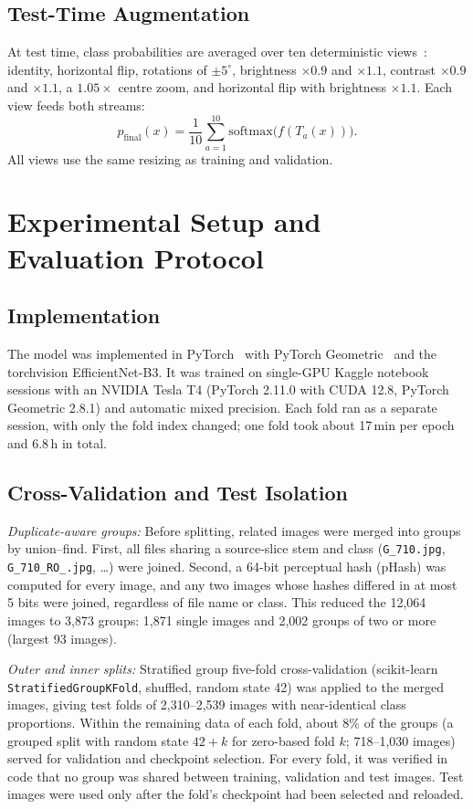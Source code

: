 \documentclass[journal,onecolumn]{IEEEtran}
\newcommand{\fname}[1]{\texttt{#1}}
\begin{document}
\subsection{Test-Time Augmentation}\label{sec:tta}
At test time, class probabilities are averaged over ten deterministic views~\cite{wang2019tta}: identity, horizontal flip, rotations of $\pm 5^\circ$, brightness $\times 0.9$ and $\times 1.1$, contrast $\times 0.9$ and $\times 1.1$, a $1.05\times$ centre zoom, and horizontal flip with brightness $\times 1.1$. Each view feeds both streams:
\begin{equation}
p_{\mathrm{final}}(x) = \frac{1}{10} \sum_{a=1}^{10} \mathrm{softmax}\big(f(T_a(x))\big).
\end{equation}
All views use the same resizing as training and validation.

\section{Experimental Setup and Evaluation Protocol}
\subsection{Implementation}
The model was implemented in PyTorch~\cite{paszke2019pytorch} with PyTorch Geometric~\cite{fey2019pyg} and the torchvision EfficientNet-B3. It was trained on single-GPU Kaggle notebook sessions with an NVIDIA Tesla T4 (PyTorch 2.11.0 with CUDA 12.8, PyTorch Geometric 2.8.1) and automatic mixed precision. Each fold ran as a separate session, with only the fold index changed; one fold took about 17\,min per epoch and 6.8\,h in total.

\subsection{Cross-Validation and Test Isolation}\label{sec:cv}
\textit{Duplicate-aware groups:} Before splitting, related images were merged into groups by union--find. First, all files sharing a source-slice stem and class (\fname{G\_710.jpg}, \fname{G\_710\_RO\_.jpg}, \dots) were joined. Second, a 64-bit perceptual hash (pHash) was computed for every image, and any two images whose hashes differed in at most 5 bits were joined, regardless of file name or class. This reduced the 12,064 images to 3,873 groups: 1,871 single images and 2,002 groups of two or more (largest 93 images).

\textit{Outer and inner splits:} Stratified group five-fold cross-validation (scikit-learn \texttt{StratifiedGroupKFold}, shuffled, random state 42) was applied to the merged images, giving test folds of 2,310--2,539 images with near-identical class proportions. Within the remaining data of each fold, about 8\% of the groups (a grouped split with random state $42 + k$ for zero-based fold $k$; 718--1,030 images) served for validation and checkpoint selection. For every fold, it was verified in code that no group was shared between training, validation and test images. Test images were used only after the fold's checkpoint had been selected and reloaded.
\end{document}
